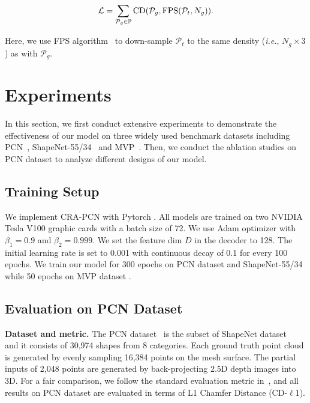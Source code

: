 \documentclass[letterpaper]{article} %
\begin{document}
\begin{equation}
\mathcal L = \sum_{{\mathcal P}_g \in \mathbb P} {\rm CD}({\mathcal P}_g, {\rm FPS}({\mathcal P}_t, N_g)).
\end{equation}\label{eqt:cd}

{\noindent}Here, we use FPS algorithm~\cite{qi2017pointnet++} to down-sample ${\mathcal P}_t$ to the same density ({\em i.e.},  $N_g \times 3$) as with ${\mathcal P}_g$.

\section{Experiments}
In this section, we first conduct extensive experiments to demonstrate the effectiveness of our model on three widely used benchmark datasets including PCN~\cite{yuan2018pcn}, ShapeNet-55/34~\cite{yu2021pointr} and MVP~\cite{pan2021multi}. 
Then, we conduct the ablation studies on PCN dataset to analyze different designs of our model.


\subsection {Training Setup}
We implement CRA-PCN with Pytorch \cite{paszke2019pytorch}. 
All  models are trained on two NVIDIA Tesla V100 graphic cards with a batch size of 72. We use Adam  optimizer \cite{kingma2014adam} with $\beta_1 = 0.9$ and $\beta_2 = 0.999$. 
We set the feature dim $D$ in the decoder to 128.
The initial learning rate is set to 0.001 with continuous decay of 0.1 for every 100 epochs. 
We train our model for 300 epochs on PCN dataset \cite{yuan2018pcn}  and ShapeNet-55/34  \cite{yu2021pointr}  while 50 epochs on MVP dataset \cite{pan2021multi}.

\subsection{Evaluation on PCN Dataset}
{\bf Dataset and metric.}
The PCN dataset~\cite{yuan2018pcn} is the subset of ShapeNet dataset~\cite{chang2015shapenet} and it consists of 30,974 shapes from 8 categories. 
Each ground truth point cloud is generated by evenly sampling 16,384 points on the mesh surface. 
The partial inputs of 2,048 points are generated by back-projecting 2.5D depth images into 3D. 
For a fair comparison, we follow the standard evaluation metric in~\cite{yuan2018pcn}, and all results on PCN dataset are evaluated in terms of L1 Chamfer Distance (CD-$\ell$1).
\end{document}
